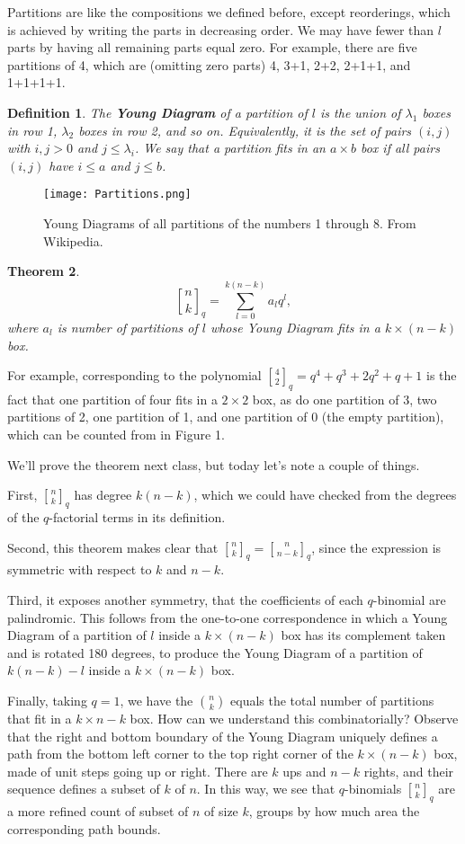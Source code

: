 \documentclass[11pt]{article}
\newtheorem{theorem}{Theorem}
\newtheorem{definition}[theorem]{Definition}
\newcommand{\qbinom}[2] {{#1 \brack #2}_q}
\begin{document}
Partitions are like the compositions we defined before, except reorderings, which is achieved by writing the parts in decreasing order. We may have fewer than $l$ parts by having all remaining parts equal zero. For example, there are five partitions of 4, which are (omitting zero parts) 4, 3+1, 2+2, 2+1+1, and 1+1+1+1.

\begin{definition}
The \textbf{Young Diagram} of a partition of $l$ is the union of $\lambda_1$ boxes in row 1, $\lambda_2$ boxes in row 2, and so on. Equivalently, it is the set of pairs $(i,j)$ with $i,j>0$ and $j\leq \lambda_i$. We say that a partition fits in an $a\times b$ box if all pairs $(i,j)$ have $i\leq a$ and $j\leq b$. 
\end{definition}

\begin{figure}
  \begin{center}
 \texttt{[image: Partitions.png]}
   \end{center}
   \caption{Young Diagrams of all partitions of the numbers 1 through 8. From Wikipedia.}
\end{figure}

\begin{theorem}
$$\qbinom{n}{k} = \sum_{l=0}^{k(n-k)}{a_l q^l},$$ where $a_l$ is number of partitions of $l$ whose Young Diagram fits in a $k \times (n-k)$ box.
\end{theorem}

For example, corresponding to the polynomial $\qbinom{4}{2} = q^4 + q^3 + 2q^2 + q + 1$ is the fact that one partition of four fits in a $2\times 2$ box, as do one partition of 3, two partitions of 2, one partition of 1, and one partition of 0 (the empty partition), which can be counted from in Figure 1.

We'll prove the theorem next class, but today let's note a couple of things. 

First, $\qbinom{n}{k}$ has degree $k(n-k)$, which we could have checked from the degrees of the $q$-factorial terms in its definition.

Second, this theorem makes clear that $\qbinom{n}{k} = \qbinom{n}{n-k}$, since the expression is symmetric with respect to $k$ and $n-k$. 

Third, it exposes another symmetry, that the coefficients of each $q$-binomial are palindromic. This follows from the one-to-one correspondence in which a Young Diagram of a partition of $l$ inside a $k \times (n-k)$ box has its complement taken and is rotated 180 degrees, to produce the Young Diagram of a partition of $k (n-k) - l$ inside a $k \times (n-k)$ box. 

Finally, taking $q=1$, we have the $\binom{n}{k}$ equals the total number of partitions that fit in a $k \times n-k$ box. How can we understand this combinatorially? Observe that the right and bottom boundary of the Young Diagram uniquely defines a path from the bottom left corner to the top right corner of the $k \times (n-k)$ box, made of unit steps going up or right. There are $k$ ups and $n-k$ rights, and their sequence defines a subset of $k$ of $n$. In this way, we see that $q$-binomials $\qbinom{n}{k}$ are a more refined count of subset of $n$ of size $k$, groups by how much area the corresponding path bounds.
\end{document}
